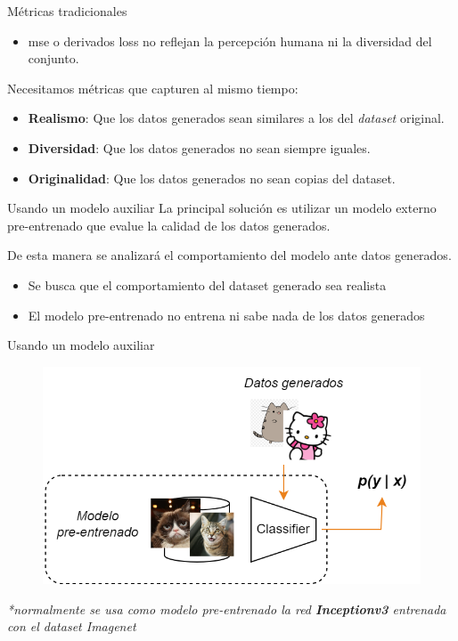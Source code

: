 \begin{frame}{Métricas tradicionales}
\begin{itemize}
    \item \gls{mse} o derivados loss no reflejan la percepción humana ni la diversidad del conjunto.
\end{itemize}

Necesitamos métricas que capturen al mismo tiempo:
\begin{itemize}
    \item \alert{\textbf{Realismo}}: Que los datos generados sean similares a los del \textit{dataset} original.
    \item \alert{\textbf{Diversidad}}: Que los datos generados no sean siempre iguales.
    \item \alert{\textbf{Originalidad}}: Que los datos generados no sean copias del dataset.
\end{itemize}
\end{frame}

\begin{frame}{Usando un modelo auxiliar}
La principal solución es utilizar un \alert{modelo externo pre-entrenado} que evalue la calidad de los datos generados.

De esta manera se analizará el \alert{comportamiento} del modelo ante datos generados.

\begin{itemize}
    \item Se busca que el comportamiento del \alert{dataset generado} sea realista
    \item El modelo pre-entrenado \alert{no entrena ni sabe nada} de los datos generados
\end{itemize}
\end{frame}

\begin{frame}{Usando un modelo auxiliar}
\begin{figure}
    \centering
    \includegraphics[width=\textwidth]{Slides/figures/GAN/Auxiliar_Model_Metrics.png}
\end{figure}

\textit{*normalmente se usa como modelo pre-entrenado la red \textbf{Inceptionv3} \cite{szegedy2015rethinking} entrenada con el dataset Imagenet}
\end{frame}

